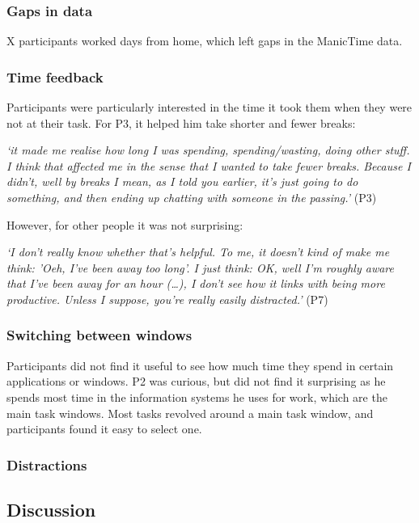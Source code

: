 \subsubsection{Gaps in data}
X participants worked days from home, which left gaps in the ManicTime data.


\subsubsection{Time feedback}
Participants were particularly interested in the time it took them when they were not at their task. For P3, it helped him take shorter and fewer breaks:

\textit{`it made me realise how long I was spending, spending/wasting, doing other stuff. I think that affected me in the sense that I wanted to take fewer breaks. Because I didn't, well by breaks I mean, as I told you earlier, it's just going to do something, and then ending up chatting with someone in the passing.'} (P3)

However, for other people it was not surprising:

\textit{`I don't really know whether that's helpful. To me, it doesn't kind of make me think: 'Oeh, I've been away too long'. I just think: OK, well I'm roughly aware that I've been away for an hour (…), I don't see how it links with being more productive. Unless I suppose, you're really easily distracted.'} (P7) 

\subsubsection{Switching between windows}
Participants did not find it useful to see how much time they spend in certain applications or windows. P2 was curious, but did not find it surprising as he spends most time in the information systems he uses for work, which are the main task windows. 
Most tasks revolved around a main task window, and participants found it easy to select one. 

\subsubsection{Distractions}

\subsection{Discussion}

